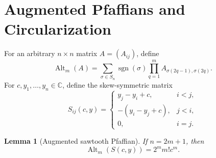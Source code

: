 \documentclass[11pt,a4paper]{article}
\newtheorem{lemma}[theorem]{Lemma}
\theoremstyle{definition}
\newcommand{\Alt}{\operatorname{Alt}}
\newcommand{\sgn}{\operatorname{sgn}}
\newcommand{\C}{\mathbb C}
\begin{document}
\section{Augmented Pfaffians and Circularization}
\label{sec:circularization}

For an arbitrary $n\times n$ matrix $A=(A_{ij})$, define
\begin{equation}\label{eq:alt}
\Alt_m(A)=\sum_{\sigma\in S_n}\sgn(\sigma)
\prod_{q=1}^{m}A_{\sigma(2q-1),\sigma(2q)}.
\end{equation}
For $c,y_1,\ldots,y_n\in\C$, define the skew-symmetric matrix
\begin{equation}\label{eq:saw}
S_{ij}(c,y)=
\begin{cases}
y_j-y_i+c,&i<j,\\
-(y_i-y_j+c),&j<i,\\
0,&i=j.
\end{cases}
\end{equation}

\begin{lemma}[Augmented sawtooth Pfaffian]\label{lem:saw}
If $n=2m+1$, then
\begin{equation}\label{eq:saw-eval}
 \Alt_m(S(c,y))=2^m m!c^m.
\end{equation}
\end{lemma}
\end{document}
